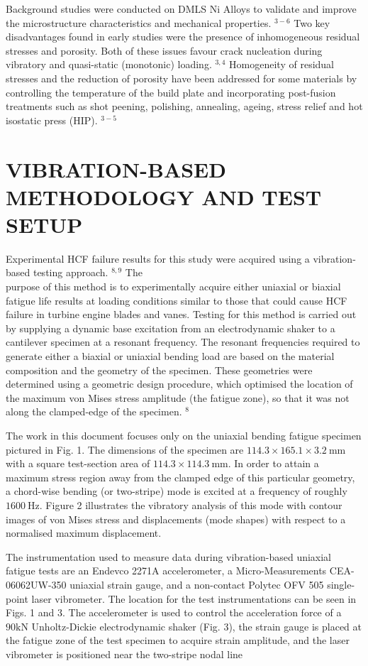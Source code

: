 \documentclass[10pt]{article}
\begin{document}
Background studies were conducted on DMLS Ni Alloys to validate and improve the microstructure characteristics and mechanical properties. ${ }^{3-6}$ Two key disadvantages found in early studies were the presence of inhomogeneous residual stresses and porosity. Both of these issues favour crack nucleation during vibratory and quasi-static (monotonic) loading. ${ }^{3,4}$ Homogeneity of residual stresses and the reduction of porosity have been addressed for some materials by controlling the temperature of the build plate and incorporating post-fusion treatments such as shot peening, polishing, annealing, ageing, stress relief and hot isostatic press (HIP). ${ }^{3-5}$

\section*{VIBRATION-BASED METHODOLOGY AND TEST SETUP}
Experimental HCF failure results for this study were acquired using a vibration-based testing approach. ${ }^{8,9}$ The\\
purpose of this method is to experimentally acquire either uniaxial or biaxial fatigue life results at loading conditions similar to those that could cause HCF failure in turbine engine blades and vanes. Testing for this method is carried out by supplying a dynamic base excitation from an electrodynamic shaker to a cantilever specimen at a resonant frequency. The resonant frequencies required to generate either a biaxial or uniaxial bending load are based on the material composition and the geometry of the specimen. These geometries were determined using a geometric design procedure, which optimised the location of the maximum von Mises stress amplitude (the fatigue zone), so that it was not along the clamped-edge of the specimen. ${ }^{8}$

The work in this document focuses only on the uniaxial bending fatigue specimen pictured in Fig. 1. The dimensions of the specimen are $114.3 \times 165.1 \times 3.2 \mathrm{~mm}$ with a square test-section area of $114.3 \times 114.3 \mathrm{~mm}$. In order to attain a maximum stress region away from the clamped edge of this particular geometry, a chord-wise bending (or two-stripe) mode is excited at a frequency of roughly $1600 \mathrm{~Hz}$. Figure 2 illustrates the vibratory analysis of this mode with contour images of von Mises stress and displacements (mode shapes) with respect to a normalised maximum displacement.

The instrumentation used to measure data during vibration-based uniaxial fatigue tests are an Endevco 2271A accelerometer, a Micro-Measurements CEA-06062UW-350 uniaxial strain gauge, and a non-contact Polytec OFV 505 single-point laser vibrometer. The location for the test instrumentations can be seen in Figs. 1 and 3. The accelerometer is used to control the acceleration force of a $90 \mathrm{kN}$ Unholtz-Dickie electrodynamic shaker (Fig. 3), the strain gauge is placed at the fatigue zone of the test specimen to acquire strain amplitude, and the laser vibrometer is positioned near the two-stripe nodal line
\end{document}
